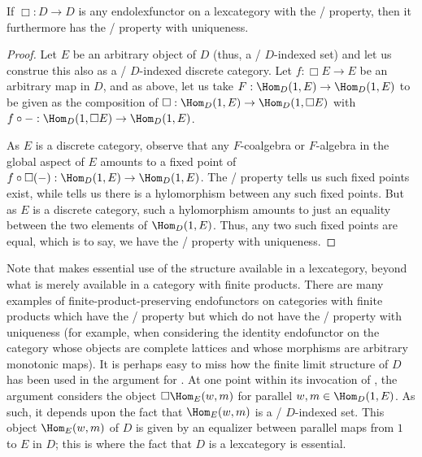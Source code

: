 \begin{corollary}\label{LexLoebIsWithUniqueness}
If $\Box : D \to D$ is any endolexfunctor on a lexcategory with the \Loeb/ property, then it furthermore has the \Loeb/ property with uniqueness.
\end{corollary}
\begin{proof}
Let $E$ be an arbitrary object of $D$ (thus, a \repsmall/ $D$-indexed set) and let us construe this also as a \repsmall/ $D$-indexed discrete category. Let $f : \Box E \to E$ be an arbitrary map in $D$, and as above, let us take $F : \Hom_D(1, E) \to \Hom_D(1, E)$ to be given as the composition of $\Box : \Hom_D(1, E) \to \Hom_D(1, \Box E)$ with $f \circ - : \Hom_D(1, \Box E) \to \Hom_D(1, E)$.

As $E$ is a discrete category, observe that any $F$-coalgebra or $F$-algebra in the global aspect of $E$ amounts to a fixed point of $f \circ \Box(-) : \Hom_D(1, E) \to \Hom_D(1, E)$. The \Loeb/ property tells us such fixed points exist, while  tells us there is a hylomorphism between any such fixed points. But as $E$ is a discrete category, such a hylomorphism amounts to just an equality between the two elements of $\Hom_D(1, E)$. Thus, any two such fixed points are equal, which is to say, we have the \Loeb/ property with uniqueness.
\end{proof}

Note that  makes essential use of the structure available in a lexcategory, beyond what is merely available in a category with finite products. There are many examples of finite-product-preserving endofunctors on categories with finite products which have the \Loeb/ property but which do not have the \Loeb/ property with uniqueness (for example, when considering the identity endofunctor on the category whose objects are complete lattices and whose morphisms are arbitrary monotonic maps). It is perhaps easy to miss how the finite limit structure of $D$ has been used in the argument for . At one point within its invocation of , the argument considers the object $\Box \Hom_E(w, m)$ for parallel $w, m \in \Hom_D(1, E)$. As such, it depends upon the fact that $\Hom_E(w, m)$ is a \repsmall/ $D$-indexed set. This object $\Hom_E(w, m)$ of $D$ is given by an equalizer between parallel maps from $1$ to $E$ in $D$; this is where the fact that $D$ is a lexcategory is essential.

